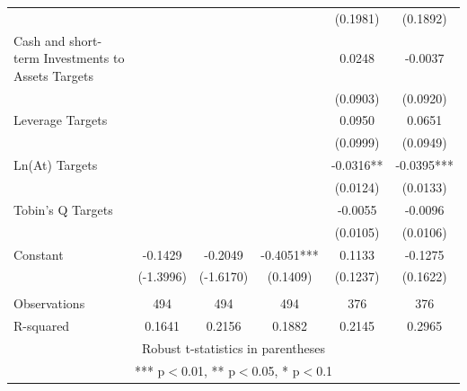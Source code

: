 \documentclass[12pt]{article}
\begin{document}
\begin{table}[ht]
\begin{adjustbox}{height=10cm, max width=\textwidth}
\begin{tabular}{lccccc}
					&  &  &  & (0.1981) & (0.1892) \\
				Cash and short-term Investments to Assets Targets &  &  &  & 0.0248 & -0.0037 \\
					&  &  &  & (0.0903) & (0.0920) \\
				Leverage Targets &  &  &  & 0.0950 & 0.0651 \\
					&  &  &  & (0.0999) & (0.0949) \\
				Ln(At) Targets &  &  &  & -0.0316** & -0.0395*** \\
					&  &  &  & (0.0124) & (0.0133) \\
				Tobin's Q Targets &  &  &  & -0.0055 & -0.0096 \\
					&  &  &  & (0.0105) & (0.0106) \\
				Constant & -0.1429 & -0.2049 & -0.4051*** & 0.1133 & -0.1275 \\
					& (-1.3996) & (-1.6170) & (0.1409) & (0.1237) & (0.1622) \\
					&  &  &  &  &  \\
				Observations & 494 & 494 & 494 & 376 & 376 \\
					R-squared & 0.1641 & 0.2156 & 0.1882 & 0.2145 & 0.2965 \\ \hline
				\multicolumn{6}{c}{ Robust t-statistics in parentheses} \\
				\multicolumn{6}{c}{ *** p$<$0.01, ** p$<$0.05, * p$<$0.1} \\
			\end{tabular}
							
		\end{adjustbox}
	\end{table}
\end{document}

